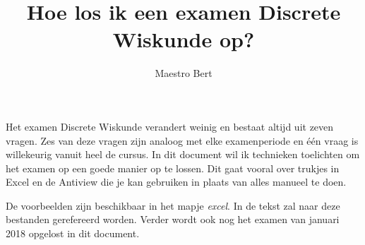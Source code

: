 \documentclass{article}
\begin{document}
\title{Hoe los ik een examen Discrete Wiskunde op?}
\date{}
\author{Maestro Bert}
\maketitle

\tableofcontents


Het examen Discrete Wiskunde verandert weinig en bestaat altijd uit zeven vragen. Zes van deze vragen zijn analoog met elke examenperiode en één vraag is willekeurig vanuit heel de cursus. In dit document wil ik technieken toelichten om het examen op een goede manier op te lossen. Dit gaat vooral over trukjes in Excel en de Antiview die je kan gebruiken in plaats van alles manueel te doen. 

De voorbeelden zijn beschikbaar in het mapje \textit{excel}. In de tekst zal naar deze bestanden gerefereerd worden. Verder wordt ook nog het examen van januari 2018 opgelost in dit document.
 




\end{document}
